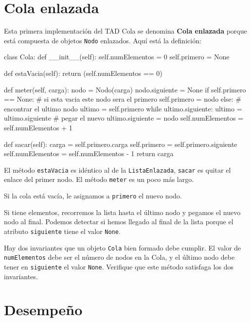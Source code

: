\section{Cola enlazada}

 

Esta primera implementación del TAD Cola se denomina \textbf{Cola
enlazada} porque está compuesta de objetos \texttt{Nodo} enlazados.
Aquí está la definición:

\beforeverb 
\begin{pythoncode}
class Cola:
  def __init__(self):
    self.numElementos = 0
    self.primero = None

  def estaVacia(self):
    return (self.numElementos == 0)

  def meter(self, carga):
    nodo = Nodo(carga)
    nodo.siguiente = None
    if self.primero == None:
      # si esta vacia este nodo sera el primero
      self.primero = nodo
    else:
      # encontrar el ultimo nodo
      ultimo = self.primero
      while ultimo.siguiente: ultimo = ultimo.siguiente
      # pegar el nuevo
      ultimo.siguiente = nodo
    self.numElementos = self.numElementos + 1

  def sacar(self):
    carga = self.primero.carga
    self.primero = self.primero.siguiente
    self.numElementos = self.numElementos - 1
    return carga
\end{pythoncode}
\afterverb El método \texttt{estaVacia} es idéntico al de la \texttt{ListaEnlazada},
\texttt{sacar} es quitar el enlace del primer nodo. El método \texttt{meter}
es un poco más largo.

Si la cola está vacía, le asignamos a \texttt{primero} el nuevo nodo.

Si tiene elementos, recorremos la lista hasta el último nodo y pegamos
el nuevo nodo al final. Podemos detectar si hemos llegado al final
de la lista porque el atributo \texttt{siguiente} tiene el valor \texttt{None}.

Hay dos invariantes que un objeto \texttt{Cola} bien formado debe
cumplir. El valor de \texttt{numElementos} debe ser el número de nodos
en la Cola, y el último nodo debe tener en \texttt{siguiente} el valor
\texttt{None}. Verifique que este método satisfaga los dos invariantes.

\section{Desempeño}

